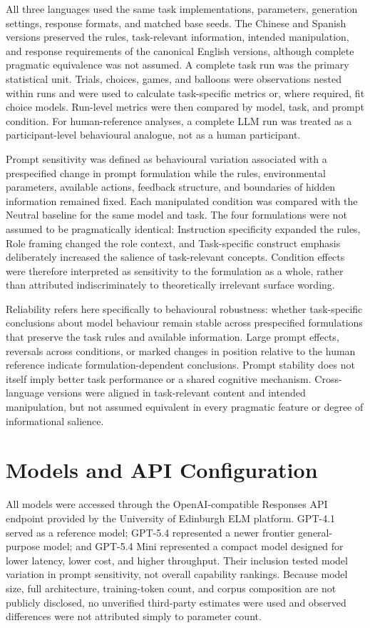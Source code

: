 \documentclass[logo,msc]{infthesis}
\begin{document}
All three languages used the same task implementations, parameters, generation settings, response formats, and matched base seeds. The Chinese and Spanish versions preserved the rules, task-relevant information, intended manipulation, and response requirements of the canonical English versions, although complete pragmatic equivalence was not assumed. A complete task run was the primary statistical unit. Trials, choices, games, and balloons were observations nested within runs and were used to calculate task-specific metrics or, where required, fit choice models. Run-level metrics were then compared by model, task, and prompt condition. For human-reference analyses, a complete LLM run was treated as a participant-level behavioural analogue, not as a human participant.

Prompt sensitivity was defined as behavioural variation associated with a prespecified change in prompt formulation while the rules, environmental parameters, available actions, feedback structure, and boundaries of hidden information remained fixed. Each manipulated condition was compared with the Neutral baseline for the same model and task. The four formulations were not assumed to be pragmatically identical: Instruction specificity expanded the rules, Role framing changed the role context, and Task-specific construct emphasis deliberately increased the salience of task-relevant concepts. Condition effects were therefore interpreted as sensitivity to the formulation as a whole, rather than attributed indiscriminately to theoretically irrelevant surface wording.

Reliability refers here specifically to behavioural robustness: whether task-specific conclusions about model behaviour remain stable across prespecified formulations that preserve the task rules and available information. Large prompt effects, reversals across conditions, or marked changes in position relative to the human reference indicate formulation-dependent conclusions. Prompt stability does not itself imply better task performance or a shared cognitive mechanism. Cross-language versions were aligned in task-relevant content and intended manipulation, but not assumed equivalent in every pragmatic feature or degree of informational salience.

\section{Models and API Configuration}

All models were accessed through the OpenAI-compatible Responses API endpoint provided by the University of Edinburgh ELM platform. GPT-4.1 served as a reference model; GPT-5.4 represented a newer frontier general-purpose model; and GPT-5.4 Mini represented a compact model designed for lower latency, lower cost, and higher throughput. Their inclusion tested model variation in prompt sensitivity, not overall capability rankings. Because model size, full architecture, training-token count, and corpus composition are not publicly disclosed, no unverified third-party estimates were used and observed differences were not attributed simply to parameter count.
\end{document}
